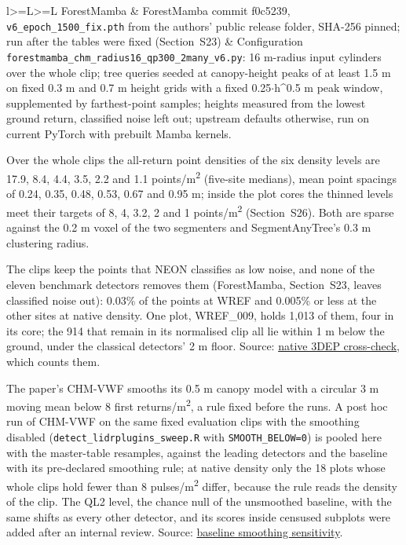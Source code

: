 \documentclass[10pt,a4paper]{article}
\makeatletter
\newcommand\suppFloatBarrier{\par\addpenalty\z@
  \ifx\@deferlist\@empty\else\expandafter\supp@flush\fi}
\newcommand\supp@flush{\let\supp@waiting\@deferlist
  \newpage
  \ifx\@deferlist\supp@waiting\null\newpage\fi
  \ifx\@deferlist\supp@waiting\expandafter\clearpage\else\expandafter\suppFloatBarrier\fi}
\gdef\supp@afterheading{}
\renewcommand\section{\suppFloatBarrier
    \gdef\supp@afterheading{\suppressfloats[t]\gdef\supp@afterheading{}}\supp@section}}
\makeatother
\begin{document}
{\begin{xltabular}{\textwidth}{l>{\hsize\linewidth=\hsize}L>{\hsize\linewidth=\hsize}L}
ForestMamba & ForestMamba commit f0c5239, \texttt{v6\_epoch\_1500\_fix.pth} from the authors' public release folder, SHA-256 pinned; run after the tables were fixed (Section~S23) & Configuration \texttt{forestmamba\_chm\_radius16\_qp300\_2many\_v6.py}: 16 m-radius input cylinders over the whole clip; tree queries seeded at canopy-height peaks of at least 1.5 m on fixed 0.3 m and 0.7 m height grids with a fixed 0.25$\cdot$h\^{}0.5 m peak window, supplemented by farthest-point samples; heights measured from the lowest ground return, classified noise left out; upstream defaults otherwise, run on current PyTorch with prebuilt Mamba kernels. \\
\end{xltabular}
}

Over the whole clips the all-return point densities of the six density levels
are 17.9, 8.4, 4.4, 3.5, 2.2 and 1.1 points/m\textsuperscript{2} (five-site medians), mean point
spacings of 0.24, 0.35, 0.48, 0.53, 0.67 and 0.95 m; inside the plot cores the
thinned levels meet their targets of 8, 4, 3.2, 2 and 1 points/m\textsuperscript{2} (Section~S26).
Both are sparse against the 0.2 m voxel of the two segmenters and
SegmentAnyTree's 0.3 m clustering radius.

The clips keep the points that NEON classifies as low noise, and none of the
eleven benchmark detectors removes them (ForestMamba, Section~S23, leaves
classified noise out): 0.03\% of the points at WREF and 0.005\% or less at the
other sites at native density. One plot, WREF\_009, holds 1,013 of them, four in
its core; the 914 that remain in its normalised clip all lie within 1 m below
the ground, under the classical detectors' 2 m floor. Source: \href{https://github.com/devakellc/lidar-tree-benchmark/blob/main/results/native-ql2-crosscheck-results.md}{native 3DEP
cross-check}, which counts them.

\section*{S16. The baseline without its smoothing}

The paper's CHM-VWF smooths its 0.5 m canopy model with a circular 3 m moving
mean below 8 first returns/m\textsuperscript{2}, a rule fixed before the runs. A post hoc run of
CHM-VWF on the same fixed evaluation clips with the smoothing disabled
(\texttt{detect\_lidrplugins\_sweep.R} with \texttt{SMOOTH\_BELOW=0}) is pooled here with the
master-table resamples, against the leading detectors and the baseline with its
pre-declared smoothing rule; at native density only the 18 plots whose whole
clips hold fewer than 8 pulses/m\textsuperscript{2} differ, because the rule reads the density of
the clip. The QL2 level, the chance null of the unsmoothed baseline, with the
same shifts as every other detector, and its scores inside censused subplots
were added after an internal review. Source: \href{https://github.com/devakellc/lidar-tree-benchmark/blob/main/results/baseline-smoothing-sensitivity-results.md}{baseline smoothing
sensitivity}.
\end{document}
